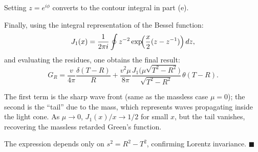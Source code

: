 \documentclass[12pt]{article}
\begin{document}
Setting $z = e^{i\phi}$ converts to the contour integral in part (e).

Finally, using the integral representation of the Bessel function:
\[
J_1(x) = \frac{1}{2\pi i}\oint z^{-2}\exp\!\Bigl(\frac{x}{2}(z-z^{-1})\Bigr)\,dz,
\]
and evaluating the residues, one obtains the final result:
\[
\boxed{G_R = \frac{v}{4\pi}\frac{\delta(T-R)}{R} + \frac{v^2\mu}{8\pi}\frac{J_1\!\bigl(\mu\sqrt{T^2-R^2}\bigr)}{\sqrt{T^2-R^2}}\,\theta(T-R).}
\]

The first term is the sharp wave front (same as the massless case $\mu=0$); the second is the ``tail'' due to the mass, which represents waves propagating inside the light cone. As $\mu \to 0$, $J_1(x)/x \to 1/2$ for small $x$, but the tail vanishes, recovering the massless retarded Green's function.

The expression depends only on $s^2 = R^2 - T^2$, confirming Lorentz invariance. $\blacksquare$
\end{document}
